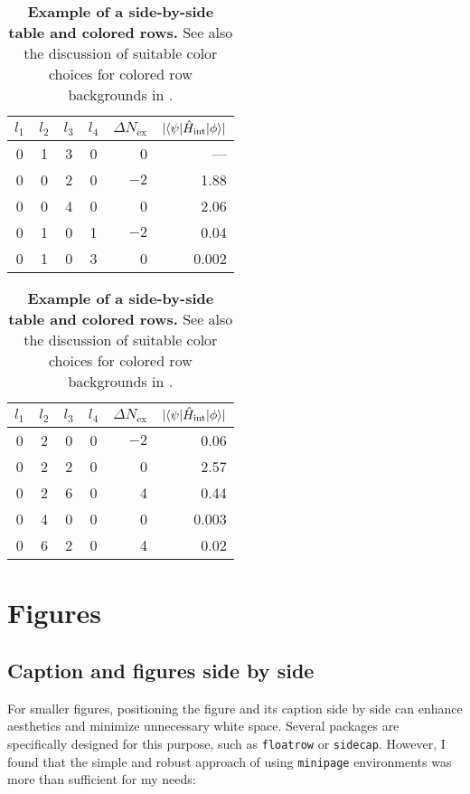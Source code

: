 \begin{table}
	\centering 
	\caption{\textbf{Example of a side-by-side table and colored rows.} See also the discussion of suitable color choices for colored row backgrounds in .}
	\label{tab:table3}
	\vspace{5ex}
	\begin{tabular}{ccccrr} 
		\toprule
		$l_1$ & $l_2$ & $l_3$ & $l_4$ & $\Delta N_\text{ex}$ & $|\langle \psi | \hat{H}_\text{int} | \phi \rangle|$  \\ 
		\midrule 
		\rowcolor{pqred} 0 & 1 & 3 & 0 & 0 & ---\\
		0 & 0 & 2 & 0 & $-2$ & 1.88\\
		\rowcolor{pqblue} 0 & 0 & 4 & 0 & 0 & 2.06\\
		0 & 1 & 0 & 1 & $-2$ & 0.04\\
		\rowcolor{pqyellow} 0 & 1 & 0 & 3 & 0 & 0.002\\
		\bottomrule
	\end{tabular}
	\hspace{0.5cm}
	\begin{tabular}{ccccrr} 
		\toprule
		$l_1$ & $l_2$ & $l_3$ & $l_4$ & $\Delta N_\text{ex}$ & $|\langle \psi | \hat{H}_\text{int} | \phi \rangle|$  \\ 
		\midrule 
		0 & 2 & 0 & 0 & $-2$ & 0.06\\
		\rowcolor{pqblue} 0 & 2 & 2 & 0 & 0 & 2.57\\
		0 & 2 & 6 & 0 & 4 & 0.44\\
		\rowcolor{pqyellow} 0 & 4 & 0 & 0 & 0 & 0.003\\
		0 & 6 & 2 & 0 & 4 & 0.02\\
		\bottomrule
	\end{tabular}
\end{table}

\section{Figures}
\subsection{Caption and figures side by side}
For smaller figures, positioning the figure and its caption side by side can enhance aesthetics and minimize unnecessary white space. Several packages are specifically designed for this purpose, such as \verb|floatrow| or \verb|sidecap|. However, I found that the simple and robust approach of using \verb|minipage| environments was more than sufficient for my needs:


